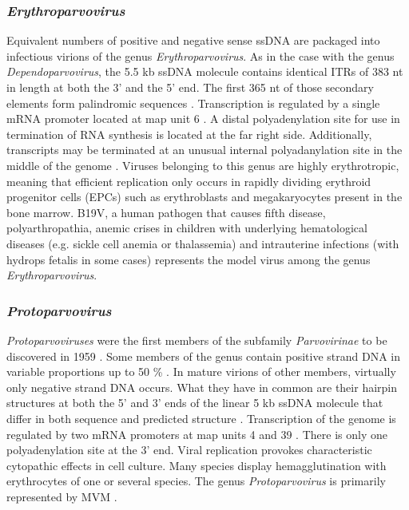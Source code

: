 \subsubsection{\textit{Erythroparvovirus}}
Equivalent numbers of positive and negative sense ssDNA are packaged into infectious virions of the genus \textit{Erythroparvovirus}. As in the case with the genus \textit{Dependoparvovirus}, the 5.5 kb ssDNA molecule contains identical ITRs of 383 nt in length at both the 3’ and the 5’ end. The first 365 nt of those secondary elements form palindromic sequences \cite{pmid2408228}. Transcription is regulated by a single mRNA promoter located at map unit 6 \cite{pmid3824910}. A distal polyadenylation site for use in termination of RNA synthesis is located at the far right side. Additionally, transcripts may be terminated at an unusual internal polyadanylation site in the middle of the genome \cite{pmid3599180}. Viruses belonging to this genus are highly erythrotropic, meaning that efficient replication only occurs in rapidly dividing erythroid progenitor cells (EPCs) such as erythroblasts and megakaryocytes present in the bone marrow.
B19V, a human pathogen that causes fifth disease, polyarthropathia, anemic crises in children with underlying hematological diseases (e.g. sickle cell anemia or thalassemia) and intrauterine infections (with hydrops fetalis in some cases) \cite{pmid12097253} represents the model virus among the genus \textit{Erythroparvovirus}. 



\subsubsection{\textit{Protoparvovirus}}
\textit{Protoparvoviruses} were the first members of the subfamily \textit{Parvovirinae} to be discovered in 1959 \cite{pmid13669314}. Some members of the genus contain positive strand DNA in variable proportions up to 50 \% \cite{pmid6694260}. In mature virions of other members, virtually only negative strand DNA occurs. What they have in common are their hairpin structures at both the 5’ and 3’ ends of the linear 5 kb ssDNA molecule that differ in both sequence and predicted structure \cite{pmid6298737}. Transcription of the genome is regulated by two mRNA promoters at map units 4 and 39 \cite{pmid6828378}. There is only one polyadenylation site at the 3’ end. 
Viral replication provokes characteristic cytopathic effects in cell culture. Many species display hemagglutination with erythrocytes of one or several species. The genus \textit{Protoparvovirus} is primarily represented by MVM \cite{icvt, parvoviruses}.       

